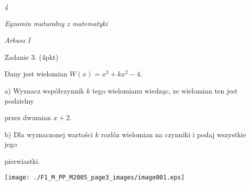 \documentclass[a4paper,12pt]{article}
\begin{document}
{\it 4}

{\it Egzamin maturalny z matematyki}

{\it Arkusz I}

Zadanie 3. (4pkt)

Dany jest wielomian $W(x)=x^{3}+kx^{2}-4.$

a) Wyznacz współczynnik $k$ tego wielomianu wiedząc, $\dot{\mathrm{z}}\mathrm{e}$ wielomian ten jest podzielny

przez dwumian $x+2.$

b) Dla wyznaczonej wartości $k$ rozłóz wielomian na czynniki i podaj wszystkie jego

pierwiastki.
\begin{center}
\texttt{[image: ./F1\_M\_PP\_M2005\_page3\_images/image001.eps]}
\end{center}
\end{document}
